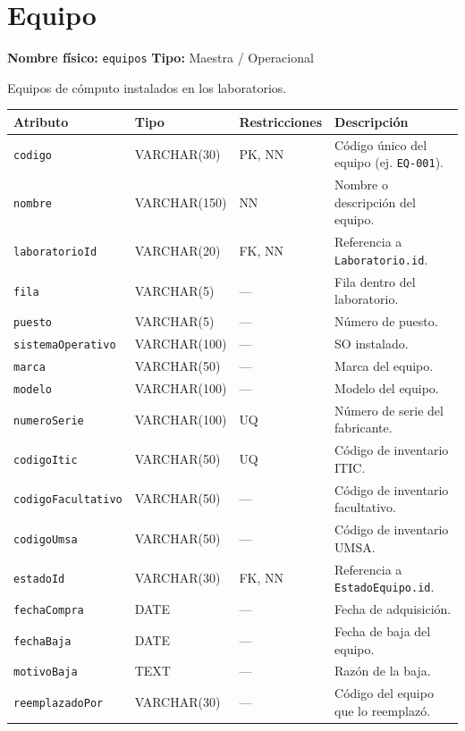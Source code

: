 \documentclass[12pt,a4paper]{article}
\newenvironment{tabladesc}[3]{%
  \section{#1}
  \textbf{Nombre físico:} \texttt{#2} \hfill \textbf{Tipo:} #3\par
  \medskip
}{%
  \bigskip
}
\begin{document}
\begin{tabladesc}{Equipo}{equipos}{Maestra / Operacional}

Equipos de cómputo instalados en los laboratorios.

\bigskip
\begin{longtable}{L{3.5cm} L{2.5cm} L{2cm} L{7.5cm}}
\toprule
\textbf{Atributo} & \textbf{Tipo} & \textbf{Restricciones} & \textbf{Descripción} \\
\midrule
\endhead
\bottomrule
\endfoot
\texttt{codigo}          & VARCHAR(30)  & PK, NN & Código único del equipo (ej. \texttt{EQ-001}). \\
\texttt{nombre}          & VARCHAR(150) & NN     & Nombre o descripción del equipo. \\
\texttt{laboratorioId}   & VARCHAR(20)  & FK, NN & Referencia a \texttt{Laboratorio.id}. \\
\texttt{fila}            & VARCHAR(5)   & ---    & Fila dentro del laboratorio. \\
\texttt{puesto}          & VARCHAR(5)   & ---    & Número de puesto. \\
\texttt{sistemaOperativo}& VARCHAR(100) & ---    & SO instalado. \\
\texttt{marca}           & VARCHAR(50)  & ---    & Marca del equipo. \\
\texttt{modelo}          & VARCHAR(100) & ---    & Modelo del equipo. \\
\texttt{numeroSerie}     & VARCHAR(100) & UQ     & Número de serie del fabricante. \\
\texttt{codigoItic}      & VARCHAR(50)  & UQ     & Código de inventario ITIC. \\
\texttt{codigoFacultativo}& VARCHAR(50) & ---    & Código de inventario facultativo. \\
\texttt{codigoUmsa}      & VARCHAR(50)  & ---    & Código de inventario UMSA. \\
\texttt{estadoId}        & VARCHAR(30)  & FK, NN & Referencia a \texttt{EstadoEquipo.id}. \\
\texttt{fechaCompra}     & DATE         & ---    & Fecha de adquisición. \\
\texttt{fechaBaja}       & DATE         & ---    & Fecha de baja del equipo. \\
\texttt{motivoBaja}      & TEXT         & ---    & Razón de la baja. \\
\texttt{reemplazadoPor}  & VARCHAR(30)  & ---    & Código del equipo que lo reemplazó. \\

\end{longtable}
\end{tabladesc}
\end{document}
